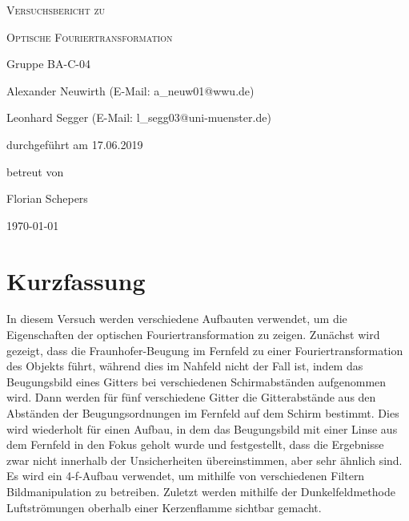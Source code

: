 \documentclass[
	a4paper,
	12pt,
	pagesize,
	ngerman
]{scrartcl}
\begin{document}
	\begin{titlepage}
		\centering
		{\scshape\LARGE Versuchsbericht zu \par}
		\vspace{1cm}
		{\scshape\huge Optische Fouriertransformation \par}
		\vspace{2.5cm}
		{\LARGE Gruppe BA-C-04 \par}
		\vspace{0.5cm}

		{\large Alexander Neuwirth (E-Mail: a\_neuw01@wwu.de) \par}
		{\large Leonhard Segger (E-Mail: l\_segg03@uni-muenster.de) \par}
		\vfill

		durchgeführt am 17.06.2019\par
		betreut von\par
		{\large Florian Schepers}

		\vfill

		{\large \today\par}
	\end{titlepage}
	\tableofcontents
	\newpage


	\section{Kurzfassung}
	In diesem Versuch werden verschiedene Aufbauten verwendet, um die Eigenschaften der optischen Fouriertransformation zu zeigen.
	Zunächst wird gezeigt, dass die Fraunhofer-Beugung im Fernfeld zu einer Fouriertransformation des Objekts führt, während dies im Nahfeld nicht der Fall ist, indem das Beugungsbild eines Gitters bei verschiedenen Schirmabständen aufgenommen wird.
	Dann werden für fünf verschiedene Gitter die Gitterabstände aus den Abständen der Beugungsordnungen im Fernfeld auf dem Schirm bestimmt.
	Dies wird wiederholt für einen Aufbau, in dem das Beugungsbild mit einer Linse aus dem Fernfeld in den Fokus geholt wurde und festgestellt, dass die Ergebnisse zwar nicht innerhalb der Unsicherheiten übereinstimmen, aber sehr ähnlich sind.
	Es wird ein 4-f-Aufbau verwendet, um mithilfe von verschiedenen Filtern Bildmanipulation zu betreiben.
	Zuletzt werden mithilfe der Dunkelfeldmethode Luftströmungen oberhalb einer Kerzenflamme sichtbar gemacht.
\end{document}
